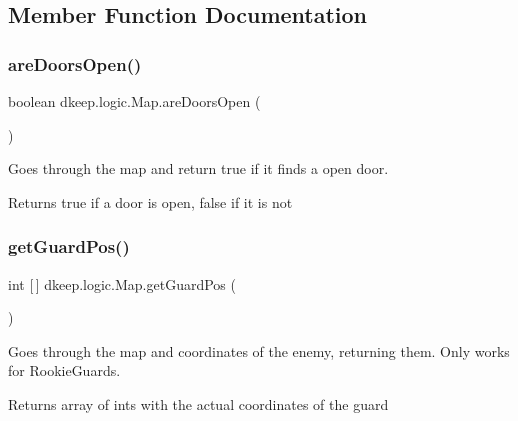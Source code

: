 \subsection{Member Function Documentation}
\mbox{\label{classdkeep_1_1logic_1_1_map_a2237fa9a56d3aa3be8638be42bbc16e6}} 
\subsubsection{\texorpdfstring{are\+Doors\+Open()}{areDoorsOpen()}}
{\footnotesize\ttfamily boolean dkeep.\+logic.\+Map.\+are\+Doors\+Open (\begin{DoxyParamCaption}{ }\end{DoxyParamCaption})}

Goes through the map and return true if it finds a open door. \begin{DoxyReturn}{Returns}
true if a door is open, false if it is not 
\end{DoxyReturn}
\mbox{\label{classdkeep_1_1logic_1_1_map_aeaad6dec94f54cf67dcb5c2bd23adbbf}} 
\subsubsection{\texorpdfstring{get\+Guard\+Pos()}{getGuardPos()}}
{\footnotesize\ttfamily int \mbox{[}$\,$\mbox{]} dkeep.\+logic.\+Map.\+get\+Guard\+Pos (\begin{DoxyParamCaption}{ }\end{DoxyParamCaption})}

Goes through the map and coordinates of the enemy, returning them. Only works for Rookie\+Guards. \begin{DoxyReturn}{Returns}
array of ints with the actual coordinates of the guard 
\end{DoxyReturn}
\mbox{\label{classdkeep_1_1logic_1_1_map_aec82d7520e74ad90f897a34c30ebc056}} 
